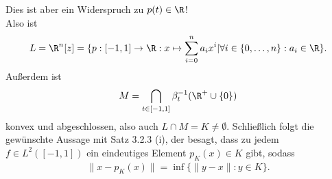\begin{solution}
Dies ist aber ein Widerspruch zu $p(t) \in \R$! \\
Also ist
\begin{align*}
L = \R^n[z] = \{p: [-1,1] \to \R: x \mapsto \sum_{i = 0}^n a_ix^i |
\forall i \in \{0,\dots,n\}: a_i \in \R\}.
\end{align*}
Außerdem ist
\begin{align*}
  M = \bigcap_{t \in [-1,1]}\beta_t^{-1}(\R^+\cup \{0\})
\end{align*}
konvex und abgeschlossen, also auch $L \cap M = K \neq \emptyset$.
Schließlich folgt die gewünschte Aussage mit Satz 3.2.3 (i), der besagt,
dass zu jedem $f \in L^2([-1,1])$ ein eindeutiges Element $p_K(x) \in K$ gibt,
sodass
\begin{align*}
  \|x - p_K(x)\| = \inf\{\|y-x\|: y \in K\}.
\end{align*}
\end{solution}
